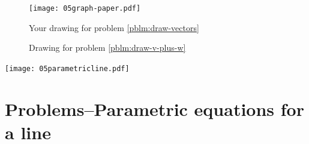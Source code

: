 \begin{figure}[ht]
  \texttt{[image: 05graph-paper.pdf]}
  \caption{Your drawing for problem \ref{pblm:draw-vectors}}
  \label{fig:draw-vectors-here}
\end{figure}


\begin{figure}[hb]
  
  \caption{Drawing for problem \ref{pblm:draw-v-plus-w}}
  \label{fig:draw-v-plus-w}
\end{figure}


\begin{center}
  \texttt{[image: 05parametricline.pdf]}
\end{center}

\section{Problems--Parametric equations for a line}  
